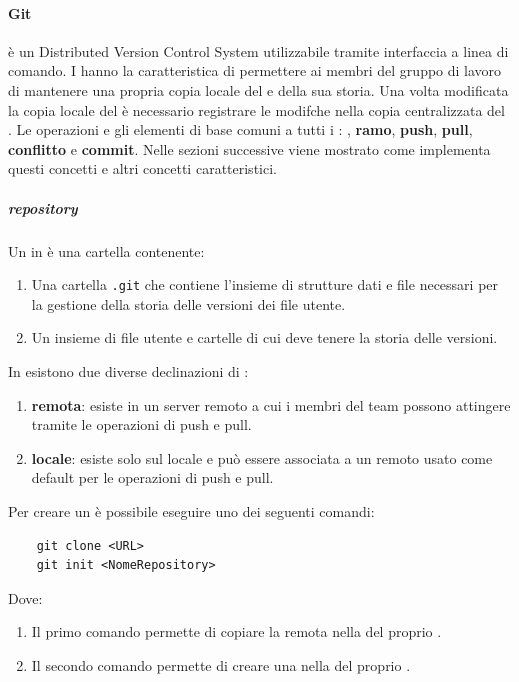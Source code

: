 \paragraph{Git}
 è un Distributed Version Control System   utilizzabile tramite interfaccia a linea di comando.
I  hanno la caratteristica di permettere ai membri del gruppo di lavoro di mantenere una propria copia locale del  e della sua storia.
Una volta modificata la copia locale del  è necessario registrare le modifche nella copia centralizzata del .
Le operazioni e gli elementi di base comuni a tutti i : \textbf{}, \textbf{ramo}, \textbf{push}, \textbf{pull}, \textbf{conflitto} e \textbf{commit}.
Nelle sezioni successive viene mostrato come  implementa questi concetti e altri concetti caratteristici.

\subparagraph{repository}
Un  in  è una cartella contenente:
\begin{enumerate}
    \item Una cartella \texttt{.git} che contiene l'insieme di strutture dati e file necessari per la gestione della storia delle versioni dei file utente.
    \item Un insieme di file utente e cartelle di cui  deve tenere la storia delle versioni.
\end{enumerate}
In  esistono due diverse declinazioni di :
\begin{enumerate}
    \item \textbf{remota}: esiste in un server remoto a cui i membri del team possono attingere tramite le operazioni di push e pull.
    
    \item \textbf{locale}: esiste solo sul  locale e può essere associata a un  remoto usato come default per le operazioni di push e pull. 
\end{enumerate} 
Per creare un  è possibile eseguire uno dei seguenti comandi:
\begin{lstlisting}
    git clone <URL>
    git init <NomeRepository>
\end{lstlisting}
Dove:
\begin{enumerate}
    \item Il primo comando permette di copiare la  remota nella  del proprio .
    \item Il secondo comando permette di creare una  nella  del proprio .
\end{enumerate}

